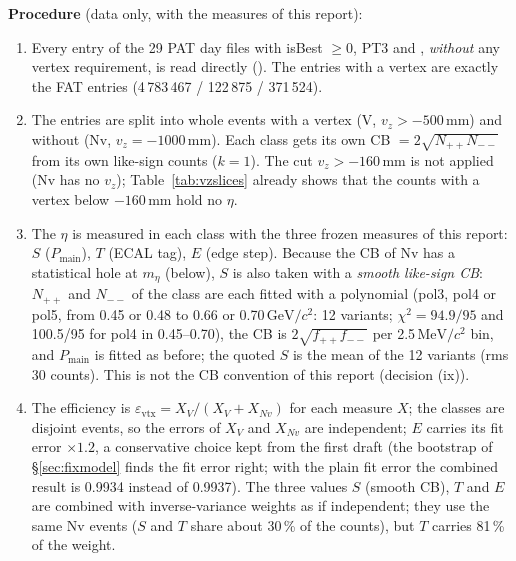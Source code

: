 \documentclass[11pt,a4paper]{article}
\newcommand{\GeVcc}{\ensuremath{\mathrm{GeV}/c^{2}}\xspace}
\newcommand{\MeVcc}{\ensuremath{\mathrm{MeV}/c^{2}}\xspace}
\newcommand{\code}[1]{\texttt{\detokenize{#1}}}
\newcommand{\Pmain}{\ensuremath{P_{\mathrm{main}}}\xspace}
\newcommand{\vz}{\ensuremath{v_z}\xspace}
\begin{document}
\textbf{Procedure} (data only, with the measures of this report):
\begin{enumerate}\setlength{\itemsep}{0pt}
\item Every entry of the 29 PAT day files with isBest $\ge0$, PT3 and \code{cor_ok}, \emph{without} any vertex requirement, is read directly
      (\code{plots/all_report/vtx_fill.C}). The entries with a vertex are exactly the FAT entries (4\,783\,467 / 122\,875 / 371\,524).
\item The entries are split into whole events with a vertex (V, $\vz>-500$\,mm) and without (Nv, $\vz=-1000$\,mm). Each class gets its own CB
      $=2\sqrt{N_{++}N_{--}}$ from its own like-sign counts ($k=1$). The cut $\vz>-160$\,mm is not applied (Nv has no \vz); Table~\ref{tab:vzslices}
      already shows that the counts with a vertex below $-160$\,mm hold no $\eta$.
\item The $\eta$ is measured in each class with the three frozen measures of this report: $S$ (\Pmain), $T$ (ECAL tag), $E$ (edge step).
      Because the CB of Nv has a statistical hole at $m_\eta$ (below), $S$ is also taken with a \emph{smooth like-sign CB}: $N_{++}$ and $N_{--}$
      of the class are each fitted with a polynomial (pol3, pol4 or pol5, from 0.45 or 0.48 to 0.66 or 0.70\,\GeVcc: 12 variants;
      $\chi^2=94.9/95$ and 100.5/95 for pol4 in 0.45--0.70), the CB is $2\sqrt{f_{++}f_{--}}$ per 2.5\,\MeVcc bin, and \Pmain is fitted as before;
      the quoted $S$ is the mean of the 12 variants (rms 30 counts). This is not the CB convention of this report (decision (ix)).
\item The efficiency is $\varepsilon_{\mathrm{vtx}}=X_V/(X_V+X_{Nv})$ for each measure $X$; the classes are disjoint events, so the errors of
      $X_V$ and $X_{Nv}$ are independent; $E$ carries its fit error $\times1.2$, a conservative choice kept from the first draft (the
      bootstrap of \S\ref{sec:fixmodel} finds the fit error right; with the plain fit error the combined result is 0.9934 instead of 0.9937). The three values $S$ (smooth CB), $T$ and
      $E$ are combined with inverse-variance weights as if independent; they use the same Nv events ($S$ and $T$ share about 30\,\% of the counts),
      but $T$ carries 81\,\% of the weight.
\end{enumerate}
\end{document}
